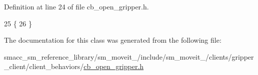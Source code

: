 Definition at line 24 of file cb\+\_\+open\+\_\+gripper.\+h.


\begin{DoxyCode}
25     \{
26     \}
\end{DoxyCode}


The documentation for this class was generated from the following file\+:\begin{DoxyCompactItemize}
\item 
smacc\+\_\+sm\+\_\+reference\+\_\+library/sm\+\_\+moveit\+\_/include/sm\+\_\+moveit\+\_/clients/gripper\+\_\+client/client\+\_\+behaviors/\hyperlink{2_2include_2sm__moveit__2_2clients_2gripper__client_2client__behaviors_2cb__open__gripper_8h}{cb\+\_\+open\+\_\+gripper.\+h}\end{DoxyCompactItemize}
